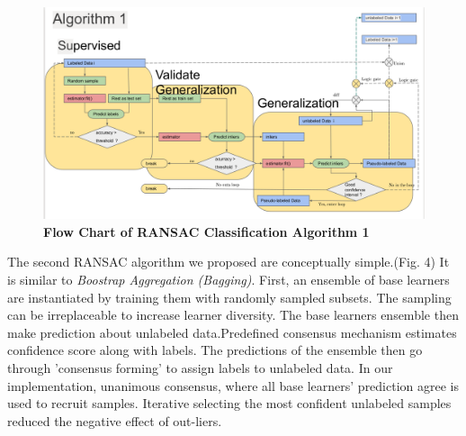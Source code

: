 \documentclass[a4paper, times, 12pt, ,onecolumn,oneside,top=1.0cm,bottom=1.0cm,left=1.0 cm,right=1cm]{article}
\begin{document}
\begin{figure}
  \centering
  \includegraphics[scale = 0.35]{imgs/RSVM1_diagram.png}
  \caption{\textbf{Flow Chart of RANSAC Classification Algorithm 1}
 }
\end{figure}

The second RANSAC algorithm we proposed are conceptually simple.(Fig. 4) It is similar to \textit{Boostrap Aggregation (Bagging)}. First, an ensemble of base learners are instantiated by training them with randomly sampled subsets. The sampling can be irreplaceable to increase learner diversity. The base learners ensemble then make prediction about unlabeled data.Predefined consensus mechanism estimates confidence score along with labels. The predictions of the ensemble then go through 'consensus forming' to assign labels to unlabeled data.  In our implementation, unanimous consensus, where all base learners' prediction agree is used to recruit samples. Iterative selecting the most confident unlabeled samples reduced the negative effect of out-liers.   
\end{document}
